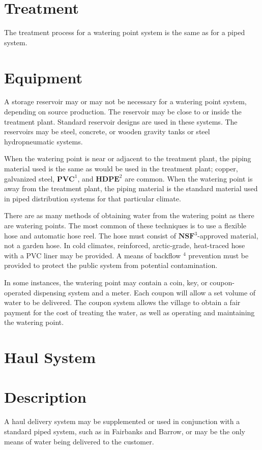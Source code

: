 \documentclass[10pt]{article}
\begin{document}
\section{Treatment}
The treatment process for a watering point system is the same as for a piped system.

\section{Equipment}
A storage reservoir may or may not be necessary for a watering point system, depending on source production. The reservoir may be close to or inside the treatment plant. Standard reservoir designs are used in these systems. The reservoirs may be steel, concrete, or wooden gravity tanks or steel hydropneumatic systems.

When the watering point is near or adjacent to the treatment plant, the piping material used is the same as would be used in the treatment plant; copper, galvanized steel, $\mathbf{P V C}^{1}$, and $\mathbf{H D P E}^{2}$ are common. When the watering point is away from the treatment plant, the piping material is the standard material used in piped distribution systems for that particular climate.

There are as many methods of obtaining water from the watering point as there are watering points. The most common of these techniques is to use a flexible hose and automatic hose reel. The hose must consist of $\mathbf{N S F}{ }^{3}$-approved material, not a garden hose. In cold climates, reinforced, arctic-grade, heat-traced hose with a PVC liner may be provided. A means of backflow ${ }^{4}$ prevention must be provided to protect the public system from potential contamination.

In some instances, the watering point may contain a coin, key, or coupon-operated dispensing system and a meter. Each coupon will allow a set volume of water to be delivered. The coupon system allows the village to obtain a fair payment for the cost of treating the water, as well as operating and maintaining the watering point.

\section{Haul System}
\section{Description}
A haul delivery system may be supplemented or used in conjunction with a standard piped system, such as in Fairbanks and Barrow, or may be the only means of water being delivered to the customer.
\end{document}
